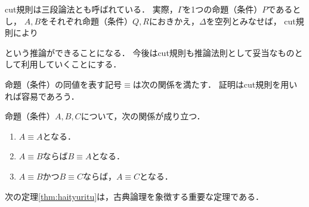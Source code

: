  cut規則は三段論法とも呼ばれている．
 実際，$\varGamma$を1つの命題（条件）$P$であるとし，
 $A, B$をそれぞれ命題（条件）$Q, R$におきかえ，$\varDelta$を空列とみなせば，
 cut規則により
 \begin{prooftree}
 \end{prooftree}
 という推論ができることになる．
 今後はcut規則も推論法則として妥当なものとして利用していくことにする．

 命題（条件）の同値を表す記号$\equiv$は次の関係を満たす．
 証明はcut規則を用いれば容易であろう．
 \begin{lemma}
   命題（条件）$A,  B,  C$について，次の関係が成り立つ．
   \begin{enumerate}[(1) ]
     \item $A \equiv A$となる．
     \item $A \equiv B$ならば$B \equiv A$となる．
     \item $A \equiv B$かつ$B \equiv C$ならば，$A \equiv C$となる．
   \end{enumerate}
 \end{lemma}

 次の定理\ref{thm:haityuritu}は，古典論理を象徴する重要な定理である．

